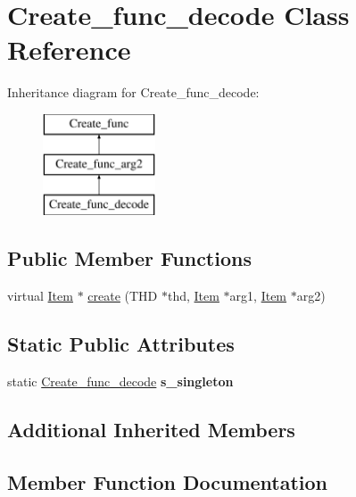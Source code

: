 \hypertarget{classCreate__func__decode}{}\section{Create\+\_\+func\+\_\+decode Class Reference}
\label{classCreate__func__decode}
Inheritance diagram for Create\+\_\+func\+\_\+decode\+:\begin{figure}[H]
\begin{center}
\leavevmode
\includegraphics[height=3.000000cm]{classCreate__func__decode}
\end{center}
\end{figure}
\subsection*{Public Member Functions}
\begin{DoxyCompactItemize}
\item 
virtual \mbox{\hyperlink{classItem}{Item}} $\ast$ \mbox{\hyperlink{classCreate__func__decode_a27cc797ca32862ac06c75fa68ce8c6d0}{create}} (T\+HD $\ast$thd, \mbox{\hyperlink{classItem}{Item}} $\ast$arg1, \mbox{\hyperlink{classItem}{Item}} $\ast$arg2)
\end{DoxyCompactItemize}
\subsection*{Static Public Attributes}
\begin{DoxyCompactItemize}
\item 
\mbox{\label{classCreate__func__decode_a6886b8781e96367dc4e3d2b01adbeed1}} 
static \mbox{\hyperlink{classCreate__func__decode}{Create\+\_\+func\+\_\+decode}} {\bfseries s\+\_\+singleton}
\end{DoxyCompactItemize}
\subsection*{Additional Inherited Members}


\subsection{Member Function Documentation}
\mbox{\label{classCreate__func__decode_a27cc797ca32862ac06c75fa68ce8c6d0}} 
